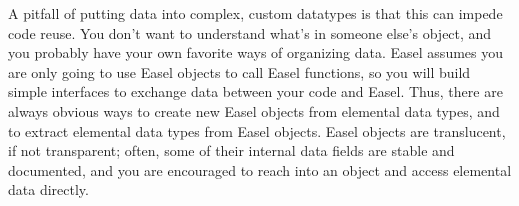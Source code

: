 A pitfall of putting data into complex, custom datatypes is that this
can impede code reuse. You don't want to understand what's in someone
else's object, and you probably have your own favorite ways of
organizing data.  Easel assumes you are only going to use Easel
objects to call Easel functions, so you will build simple interfaces
to exchange data between your code and Easel. Thus, there are always
obvious ways to create new Easel objects from elemental data types,
and to extract elemental data types from Easel objects. Easel objects
are translucent, if not transparent; often, some of their internal
data fields are stable and documented, and you are encouraged to reach
into an object and access elemental data directly.


